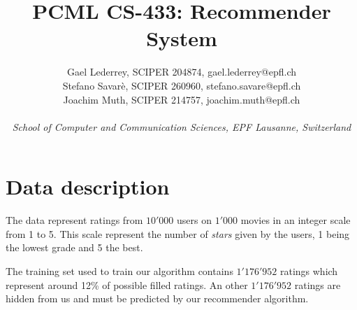 \documentclass[10pt,conference,compsocconf]{IEEEtran}
\begin{document}
\title{PCML CS-433: Recommender System}

\author{
  Gael Lederrey, SCIPER 204874, gael.lederrey@epfl.ch \\
  Stefano Savar\`e, SCIPER 260960, stefano.savare@epfl.ch \\
  Joachim Muth, SCIPER 214757, joachim.muth@epfl.ch\\ \\
  \textit{School of Computer and Communication Sciences, EPF Lausanne, Switzerland}
}

\maketitle

\begin{abstract}

\end{abstract}

\section{Data description}

The data represent ratings from $10'000$ users on $1'000$ movies in an integer scale from 1 to 5. This scale represent the number of \textit{stars} given by the users, 1 being the lowest grade and 5 the best.

The training set used to train our algorithm contains $1'176'952$ ratings which represent around 12\% of possible filled ratings. 
An other $1'176'952$ ratings are hidden from us and must be predicted by our recommender algorithm.


\end{document}
